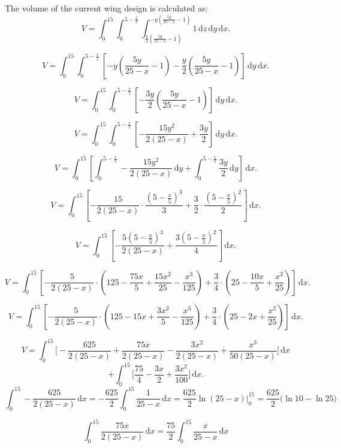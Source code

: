 \documentclass[12pt]{article}
\begin{document}
The volume of the current wing design is calculated as:
\[
V = \int_{0}^{15} \int_{0}^{5 - \frac{x}{5}} \int_{\frac{y}{2} \left( \frac{5y}{25 - x} - 1 \right)}^{-y \left( \frac{5y}{25 - x} - 1 \right)} 1 \, \mathrm{d}z \, \mathrm{d}y \, \mathrm{d}x.
\]

\[
V = \int_{0}^{15} \int_{0}^{5 - \frac{x}{5}} \left[ -y \left( \frac{5y}{25 - x} - 1 \right) - \frac{y}{2} \left( \frac{5y}{25 - x} - 1 \right) \right] \, \mathrm{d}y \, \mathrm{d}x.
\]

\[
V = \int_{0}^{15} \int_{0}^{5 - \frac{x}{5}} \left[ -\frac{3y}{2} \left( \frac{5y}{25 - x} - 1 \right) \right] \, \mathrm{d}y \, \mathrm{d}x.
\]

\[
V = \int_{0}^{15} \int_{0}^{5 - \frac{x}{5}} \left[ -\frac{15y^2}{2(25 - x)} + \frac{3y}{2} \right] \, \mathrm{d}y \, \mathrm{d}x.
\]

\[
V = \int_{0}^{15} \left[ \int_{0}^{5 - \frac{x}{5}} -\frac{15y^2}{2(25 - x)} \, \mathrm{d}y + \int_{0}^{5 - \frac{x}{5}} \frac{3y}{2} \, \mathrm{d}y \right] \, \mathrm{d}x.
\]

\[
V = \int_{0}^{15} \left[ -\frac{15}{2(25 - x)} \cdot \frac{\left( 5 - \frac{x}{5} \right)^3}{3} + \frac{3}{2} \cdot \frac{\left( 5 - \frac{x}{5} \right)^2}{2} \right] \, \mathrm{d}x.
\]

\[
V = \int_{0}^{15} \left[ -\frac{5 \left( 5 - \frac{x}{5} \right)^3}{2(25 - x)} + \frac{3 \left( 5 - \frac{x}{5} \right)^2}{4} \right] \, \mathrm{d}x.
\]

\[
V = \int_{0}^{15} \left[ -\frac{5}{2(25 - x)} \cdot \left( 125 - \frac{75x}{5} + \frac{15x^2}{25} - \frac{x^3}{125} \right) + \frac{3}{4} \cdot \left( 25 - \frac{10x}{5} + \frac{x^2}{25} \right) \right] \, \mathrm{d}x.
\]

\[
V = \int_{0}^{15} \left[ -\frac{5}{2(25 - x)} \cdot \left( 125 - 15x + \frac{3x^2}{5} - \frac{x^3}{125} \right) + \frac{3}{4} \cdot \left( 25 - 2x + \frac{x^2}{25} \right) \right] \, \mathrm{d}x.
\]


\[
V = \int_{0}^{15} \Bigg[ 
-\frac{625}{2(25 - x)} 
+ \frac{75x}{2(25 - x)} 
- \frac{3x^2}{2(25 - x)} 
+ \frac{x^3}{50(25 - x)} 
\Bigg] \, \mathrm{d}x
\]
\[
+ \int_{0}^{15} \Bigg[ 
\frac{75}{4} 
- \frac{3x}{2} 
+ \frac{3x^2}{100} 
\Bigg] \, \mathrm{d}x.
\]
\small{
\[  \int_{0}^{15}
-\frac{625}{2(25 - x)} \, \mathrm{d}x = -\frac{625}{2} \int_{0}^{15} \frac{1}{25 - x} \, \mathrm{d}x = \frac{625}{2} \ln(25 - x) \Bigg |^{15}_{0} = \frac{625}{2}\Bigg(\ln 10 - \ln25\Bigg)  \]}

\[ \int_{0}^{15} \frac{75x}{2(25-x)} \, \mathrm{d}x = \frac{75}{2} \int_{0}^{15} \frac{x}{25 - x} \, \mathrm{d}x \]
\end{document}
